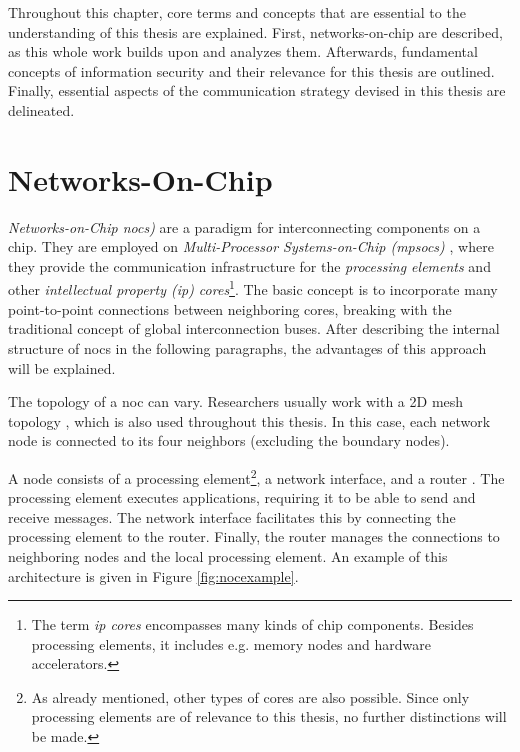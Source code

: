 Throughout this chapter, core terms and concepts that are essential to the understanding of this thesis are explained. First, networks-on-chip are
described, as this whole work builds upon and analyzes them. Afterwards, fundamental concepts of information security and their relevance for this
thesis are outlined. Finally, essential aspects of the communication strategy devised in this thesis are delineated.

\section{Networks-On-Chip}\label{sec:networkonchipfun}
\textit{Networks-on-Chip \glspl{noc})} are a paradigm for interconnecting components on a chip. They are employed on
\textit{Multi-Processor Systems-on-Chip (\glspl{mpsoc})} \cites(e.g.)(){ivanov05nocintroduction}{biswas15routerattack}{tatas16designingnocs}, where they
provide the communication infrastructure for the \textit{processing elements} and other \textit{intellectual property (\gls{ip}) cores}\footnote{The
term \textit{\gls{ip} cores} encompasses many kinds of chip components. Besides processing elements, it includes e.g. memory nodes and
hardware accelerators.}. The basic concept is to incorporate many point-to-point connections between neighboring cores, breaking with the traditional
concept of global interconnection buses. After describing the internal structure of \glspl{noc} in the following paragraphs, the advantages of this
approach will be explained.

The topology of a \gls{noc} can vary. Researchers usually work with a 2D mesh topology
\cites(e.g.)(){frey17hardenednoc}{kumar02networkonchip}{fernandes16nocrouting}{boraten16packetsecurity}, which is also used throughout this thesis.
In this case, each network node is connected to its four neighbors (excluding the boundary nodes).

A node consists of a processing element\footnote{As already mentioned, other types of cores are also possible. Since only processing elements are of
relevance to this thesis, no further distinctions will be made.}, a network interface, and a router \cite{dally01routepacketsnotwires}. The processing
element executes applications, requiring it to be able to send and receive messages. The network interface facilitates this by connecting the
processing element to the router. Finally, the router manages the connections to neighboring nodes and the local processing element. An example of
this architecture is given in Figure \vref{fig:nocexample}.

